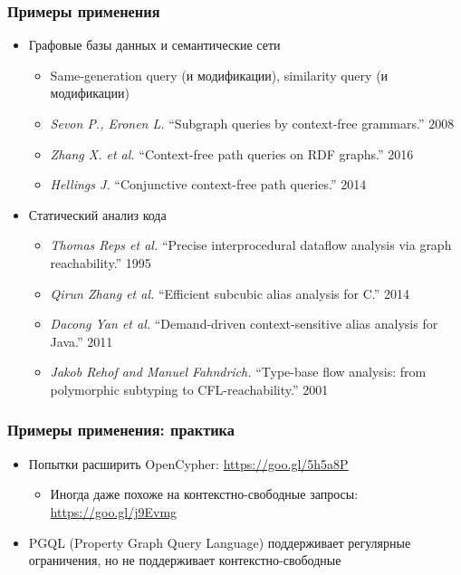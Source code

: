 \documentclass[xcolor=table,aspectratio=169]{beamer}
\begin{document}
\begin{frame}[fragile]
  \transwipe[direction=90]
  \frametitle{Примеры применения}
  \begin{itemize}
  \item Графовые базы данных и семантические сети
    \begin{itemize}
        \item Same-generation query (и модификации), similarity query (и модификации)
        \item \emph{Sevon P., Eronen L.} ``Subgraph queries by context-free grammars.'' 2008
        \item \emph{Zhang X. et al.} ``Context-free path queries on RDF graphs.'' 2016
        \item \emph{Hellings J.} ``Conjunctive context-free path queries.'' 2014
    \end{itemize}
    \item Статический анализ кода
    \begin{itemize}
        \item \emph{Thomas Reps et al.} ``Precise interprocedural dataflow analysis via graph reachability.'' 1995 
        \item \emph{Qirun Zhang et al.}  ``Efficient subcubic alias analysis for C.'' 2014
        \item \emph{Dacong Yan et al.} ``Demand-driven context-sensitive alias analysis for Java.'' 2011
        \item \emph{Jakob Rehof and Manuel Fahndrich.} ``Type-base flow analysis: from polymorphic subtyping to CFL-reachability.'' 2001
    \end{itemize}

  \end{itemize}

\end{frame}

\begin{frame}
  \transwipe[direction=90]
  \frametitle{Примеры применения: практика}

\begin{itemize} 
\item Попытки расширить OpenCypher: \url{https://goo.gl/5h5a8P}
\begin{itemize} 
\item Иногда даже похоже на контекстно-свободные запросы: \url{https://goo.gl/j9Evmg} 
\end{itemize}

\item PGQL (Property Graph Query Language) поддерживает регулярные ограничения, но не поддерживает контекстно-свободные

\end{itemize}

\end{frame}
\end{document}
